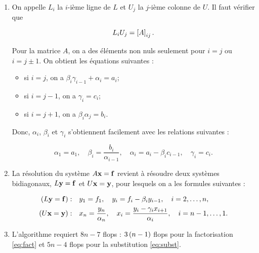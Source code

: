 \begin{enumerate}[label=\alph*)]
  \item On appelle $L_{i}$ la $i$-ième ligne de $L$ et $U_{j}$ la $j$-ième colonne de $U$.
        Il faut vérifier que
        
        \begin{equation*}
          L_{i} U_{j} = \squared{A}_{ij}.
        \end{equation*}
        
        Pour la matrice $A$, on a des éléments non nuls seulement pour $i = j$ ou $i = j \pm 1$.
        On obtient les équations suivantes :
        
        \begin{itemize}
          \item si $i = j$, on a $\beta_{i} \gamma_{i-1} + \alpha_{i} = a_{i}$;
          \item si $i = j - 1$, on a $\gamma_{i} = c_{i}$;
          \item si $i = j + 1$, on a $\beta_{i} \alpha_{j} = b_{i}$.
        \end{itemize}
        
        Donc, $\alpha_{i}$, $\beta_{i}$ et $\gamma_{i}$ s'obtiennent facilement avec les relations suivantes :
        
        \begin{equation}
        \label{eq:fact}
          \alpha_{1} = a_{1}, \quad 
          \beta_{i} = \dfrac{b_{i}}{\alpha_{i-1}}, \quad 
          \alpha_{i} = a_{i} - \beta_{i} c_{i-1}, \quad 
          \gamma_{i} = c_{i}.
        \end{equation}
        
  \item La résolution du système $A \BoldX = \BoldF$ revient à résoudre deux systèmes bidiagonaux, $L \BoldY = \BoldF$ et $U \BoldX = \BoldY$, pour lesquels on a les formules suivantes :
  
        \begin{equation}
        \label{eq:subst}
          \begin{split}
              \parent{L \BoldY = \BoldF} :  & \quad   y_{1} = f_{1}, \quad y_{i} = f_{i} - \beta_{i} y_{i-1}, \quad i = 2, \dots, n, \\
              \parent{U \BoldX = \BoldY} :  & \quad   x_{n} = \dfrac{y_{n}}{\alpha_{n}}, \quad x_{i} = \dfrac{y_{i} - \gamma_{i} x_{i+1}}{\alpha_{i}}, \quad i = n-1, \dots, 1.
          \end{split}
        \end{equation}
        
  \item L'algorithme requiert $8n - 7$ flops : $3 \parent{n-1}$ flops pour la factorisation \eqref{eq:fact} et $5n - 4$ flops pour la substitution \eqref{eq:subst}.
        
        
        
        
\end{enumerate}